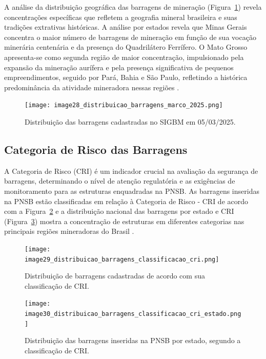 A análise da distribuição geográfica das barragens de mineração (Figura~\ref{fig:distribuicao_barragens_marco_2025}) revela concentrações específicas que refletem a geografia mineral brasileira e suas tradições extrativas históricas. A análise por estados revela que Minas Gerais concentra o maior número de barragens de mineração em função de sua vocação minerária centenária e da presença do Quadrilátero Ferrífero. O Mato Grosso apresenta-se como segunda região de maior concentração, impulsionado pela expansão da mineração aurífera e pela presença significativa de pequenos empreendimentos, seguido por Pará, Bahia e São Paulo, refletindo a histórica predominância da atividade mineradora nessas regiões \cite{anm2025boletim}.

\begin{figure}[htbp]
    \centering
    \texttt{[image: image28\_distribuicao\_barragens\_marco\_2025.png]}
    \caption{Distribuição das barragens cadastradas no SIGBM em 05/03/2025.}
    \label{fig:distribuicao_barragens_marco_2025}
\end{figure}

\subsection{Categoria de Risco das Barragens}

A Categoria de Risco (CRI) é um indicador crucial na avaliação da segurança de barragens, determinando o nível de atenção regulatória e as exigências de monitoramento para as estruturas enquadradas na PNSB. As barragens inseridas na PNSB estão classificadas em relação à Categoria de Risco - CRI de acordo com a Figura~\ref{fig:distribuicao_barragens_classificacao_cri} e a distribuição nacional das barragens por estado e CRI (Figura~\ref{fig:distribuicao_barragens_classificacao_cri_estado}) mostra a concentração de estruturas em diferentes categorias nas principais regiões mineradoras do Brasil \cite{anm2025boletim}.

\begin{figure}[htbp]
    \centering
    \texttt{[image: image29\_distribuicao\_barragens\_classificacao\_cri.png]}
    \caption{Distribuição de barragens cadastradas de acordo com sua classificação de CRI.}
    \label{fig:distribuicao_barragens_classificacao_cri}
\end{figure}

\begin{figure}[htbp]
    \centering
    \texttt{[image: image30\_distribuicao\_barragens\_classificacao\_cri\_estado.png]}
    \caption{Distribuição das barragens inseridas na PNSB por estado, segundo a classificação de CRI.}
    \label{fig:distribuicao_barragens_classificacao_cri_estado}
\end{figure}


